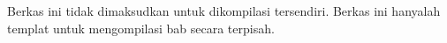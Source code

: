 \documentclass[openany]{memoir}
\begin{document}
Berkas ini tidak dimaksudkan untuk dikompilasi tersendiri. Berkas ini
hanyalah templat untuk mengompilasi bab secara terpisah.
\end{document}

